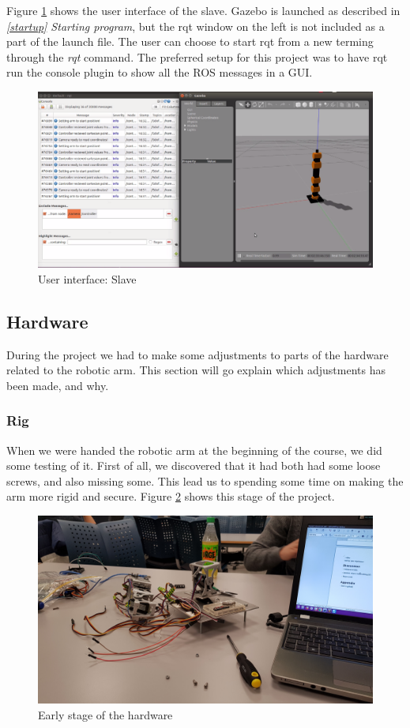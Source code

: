 \documentclass[11pt,a4paper, titlepage]{article}
\begin{document}
	Figure \ref{fig:ui-slave} shows the user interface of the slave. Gazebo is launched as described in \textit{\ref{startup} Starting program}, but the rqt window on the left is not included as a part of the launch file. The user can choose to start rqt from a new terming through the \textit{rqt} command. The preferred setup for this project was to have rqt run the console plugin to show all the ROS messages in a GUI.
	
	\begin{figure}[H]
		\centering
		\includegraphics[width=0.95\linewidth]{../Diagrams/UI-slave.png}
		\caption{User interface: Slave}
		\label{fig:ui-slave}
	\end{figure}
	
	\subsection{Hardware}
	During the project we had to make some adjustments to parts of the hardware related to the robotic arm. This section will go explain which adjustments has been made, and why.
	\subsubsection{Rig}
	When we were handed the robotic arm at the beginning of the course, we did some testing of it. First of all, we discovered that it had both had some loose screws, and also missing some. This lead us to spending some time on making the arm more rigid and secure. Figure \ref{fig:early-rig} shows this stage of the project.
	
	\begin{figure}[H]
		\centering
		\includegraphics[width=0.8\linewidth]{../Diagrams/early-setup.jpg}
		\caption{Early stage of the hardware}
		\label{fig:early-rig}
	\end{figure}
	
\end{document}
